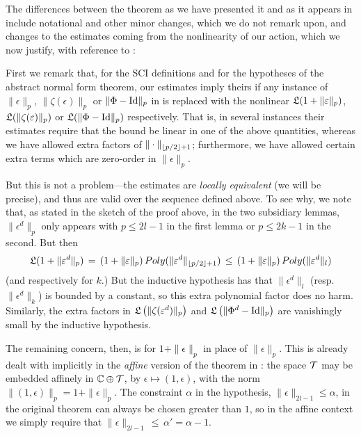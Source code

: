 \documentclass{article}
\begin{document}
\begin{rem}\label{justify changes}
The differences between the theorem as we have presented it and as it appears in \cite{MirandaMonnierZung} include notational and other minor changes, which we do not remark upon, and changes to the estimates coming from the nonlinearity of our action, which we now justify, with reference to \cite[Sections 6.2 and 7]{MirandaMonnierZung}:

First we remark that, for the SCI definitions and for the hypotheses of the abstract normal form theorem, our estimates imply theirs if any instance of $\|\epsilon\|_p$, $\|\zeta(\epsilon)\|_p$ or $\|\Phi-\textrm{Id}\|_p$ in \cite{MirandaMonnierZung} is replaced with the nonlinear $\mathfrak{L}(1+\|\varepsilon\|_p)$, $\mathfrak{L}(\|\zeta(\varepsilon)\|_p)$ or $\mathfrak{L}(\|\Phi-\textrm{Id}\|_p)$ respectively.  That is, in several instances their estimates require that the bound be linear in one of the above quantities, whereas we have allowed extra factors of $\|\cdot\|_{\left\lfloor p/2 \right\rfloor+1}$; furthermore, we have allowed certain extra terms which are zero-order in $\|\epsilon\|_p$.

But this is not a problem---the estimates are \emph{locally equivalent} (we will be precise), and thus are valid over the sequence defined above.  To see why, we note that, as stated in the sketch of the proof above, in the two subsidiary lemmas, $\|\epsilon^d\|_p$ only appears with $p\leq2l-1$ in the first lemma or $p\leq2k-1$ in the second.  But then
$$\mathfrak{L}(1+\|\varepsilon^d\|_p) \,=\, (1+\|\varepsilon\|_p)\,Poly(\|\varepsilon^d\|_{\left\lfloor p/2 \right\rfloor+1}) \,\leq\, (1+\|\varepsilon\|_p)\,Poly(\|\varepsilon^d\|_l)$$
(and respectively for $k$.)  But the inductive hypothesis has that $\|\epsilon^d\|_l$ (resp. $\|\epsilon^d\|_k$) is bounded by a constant, so this extra polynomial factor does no harm.  Similarly, the extra factors in $\mathfrak{L}\left(\|\zeta(\varepsilon^d)\|_p\right)$ and $\mathfrak{L}\left(\|\Phi^d-\textrm{Id}\|_p\right)$ are vanishingly small by the inductive hypothesis.

The remaining concern, then, is for $1+\|\epsilon\|_p$ in place of $\|\epsilon\|_p$.  This is already dealt with implicitly in the \emph{affine} version of the theorem in \cite{MirandaMonnierZung}: the space $\mathcal{T}$ may be embedded affinely in $\mathbb C \oplus \mathcal{T}$, by $\epsilon \mapsto (1,\epsilon)$, with the norm $\|(1,\epsilon)\|_p = 1 + \|\epsilon\|_p$.  The constraint $\alpha$ in the hypothesis, $\|\epsilon\|_{2l-1}\leq\alpha$, in the original theorem can always be chosen greater than $1$, so in the affine context we simply require that $\|\epsilon\|_{2l-1} \,\leq\, \alpha'=\alpha-1$.
\end{rem}
\end{document}
